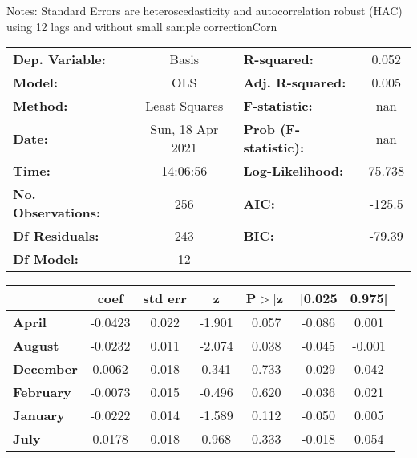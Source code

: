 Notes: \newline
 [1] Standard Errors are heteroscedasticity and autocorrelation robust (HAC) using 12 lags and without small sample correctionCorn\begin{center}
\begin{tabular}{lclc}
\toprule
\textbf{Dep. Variable:}    &      Basis       & \textbf{  R-squared:         } &     0.052   \\
\textbf{Model:}            &       OLS        & \textbf{  Adj. R-squared:    } &     0.005   \\
\textbf{Method:}           &  Least Squares   & \textbf{  F-statistic:       } &       nan   \\
\textbf{Date:}             & Sun, 18 Apr 2021 & \textbf{  Prob (F-statistic):} &      nan    \\
\textbf{Time:}             &     14:06:56     & \textbf{  Log-Likelihood:    } &    75.738   \\
\textbf{No. Observations:} &         256      & \textbf{  AIC:               } &    -125.5   \\
\textbf{Df Residuals:}     &         243      & \textbf{  BIC:               } &    -79.39   \\
\textbf{Df Model:}         &          12      & \textbf{                     } &             \\
\bottomrule
\end{tabular}
\begin{tabular}{lcccccc}
                   & \textbf{coef} & \textbf{std err} & \textbf{z} & \textbf{P$> |$z$|$} & \textbf{[0.025} & \textbf{0.975]}  \\
\midrule
\textbf{April}     &      -0.0423  &        0.022     &    -1.901  &         0.057        &       -0.086    &        0.001     \\
\textbf{August}    &      -0.0232  &        0.011     &    -2.074  &         0.038        &       -0.045    &       -0.001     \\
\textbf{December}  &       0.0062  &        0.018     &     0.341  &         0.733        &       -0.029    &        0.042     \\
\textbf{February}  &      -0.0073  &        0.015     &    -0.496  &         0.620        &       -0.036    &        0.021     \\
\textbf{January}   &      -0.0222  &        0.014     &    -1.589  &         0.112        &       -0.050    &        0.005     \\
\textbf{July}      &       0.0178  &        0.018     &     0.968  &         0.333        &       -0.018    &        0.054     \\

\end{tabular}
\end{center}
